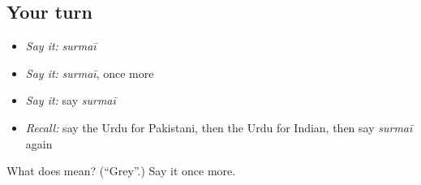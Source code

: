 \subsection*{Your turn}
\begin{itemize}
\raggedright
  \item \emph{Say it:} \emph{surmaī}
  \item \emph{Say it:} \emph{surmaī}, once more
  \item \emph{Say it:} say \emph{surmaī}
  \item \emph{Recall:} say the Urdu for Pakistani, then the Urdu for Indian, then say \emph{surmaī} again
\end{itemize}

\begin{tcolorbox}[breakable,colback=teal!4,colframe=teal!35!black,title={Before you move on}]
What does  mean? (\textquotedblleft{}Grey\textquotedblright{}.) Say it once more.
\end{tcolorbox}
